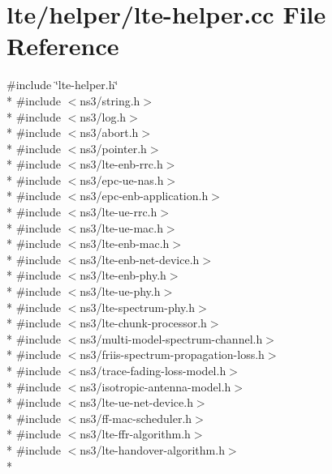 \hypertarget{lte-helper_8cc}{}\section{lte/helper/lte-\/helper.cc File Reference}
\label{lte-helper_8cc}
{\ttfamily \#include \char`\"{}lte-\/helper.\+h\char`\"{}}\\*
{\ttfamily \#include $<$ns3/string.\+h$>$}\\*
{\ttfamily \#include $<$ns3/log.\+h$>$}\\*
{\ttfamily \#include $<$ns3/abort.\+h$>$}\\*
{\ttfamily \#include $<$ns3/pointer.\+h$>$}\\*
{\ttfamily \#include $<$ns3/lte-\/enb-\/rrc.\+h$>$}\\*
{\ttfamily \#include $<$ns3/epc-\/ue-\/nas.\+h$>$}\\*
{\ttfamily \#include $<$ns3/epc-\/enb-\/application.\+h$>$}\\*
{\ttfamily \#include $<$ns3/lte-\/ue-\/rrc.\+h$>$}\\*
{\ttfamily \#include $<$ns3/lte-\/ue-\/mac.\+h$>$}\\*
{\ttfamily \#include $<$ns3/lte-\/enb-\/mac.\+h$>$}\\*
{\ttfamily \#include $<$ns3/lte-\/enb-\/net-\/device.\+h$>$}\\*
{\ttfamily \#include $<$ns3/lte-\/enb-\/phy.\+h$>$}\\*
{\ttfamily \#include $<$ns3/lte-\/ue-\/phy.\+h$>$}\\*
{\ttfamily \#include $<$ns3/lte-\/spectrum-\/phy.\+h$>$}\\*
{\ttfamily \#include $<$ns3/lte-\/chunk-\/processor.\+h$>$}\\*
{\ttfamily \#include $<$ns3/multi-\/model-\/spectrum-\/channel.\+h$>$}\\*
{\ttfamily \#include $<$ns3/friis-\/spectrum-\/propagation-\/loss.\+h$>$}\\*
{\ttfamily \#include $<$ns3/trace-\/fading-\/loss-\/model.\+h$>$}\\*
{\ttfamily \#include $<$ns3/isotropic-\/antenna-\/model.\+h$>$}\\*
{\ttfamily \#include $<$ns3/lte-\/ue-\/net-\/device.\+h$>$}\\*
{\ttfamily \#include $<$ns3/ff-\/mac-\/scheduler.\+h$>$}\\*
{\ttfamily \#include $<$ns3/lte-\/ffr-\/algorithm.\+h$>$}\\*
{\ttfamily \#include $<$ns3/lte-\/handover-\/algorithm.\+h$>$}\\*
